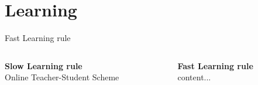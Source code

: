 \documentclass[17pt, t, lualatex]{beamer}
\begin{document}
\section{Learning}\insertsectionpage



\begin{frame}{Fast Learning rule}
	\begin{columns}
		\begin{column}{0.45\textwidth}
			\textbf{Slow Learning rule}\\
			Online Teacher-Student Scheme

		\end{column}
		\begin{column}{0.45\textwidth}
			\textbf{Fast Learning rule}\\
			content...
		\end{column}
	\end{columns}
\end{frame}
\end{document}
